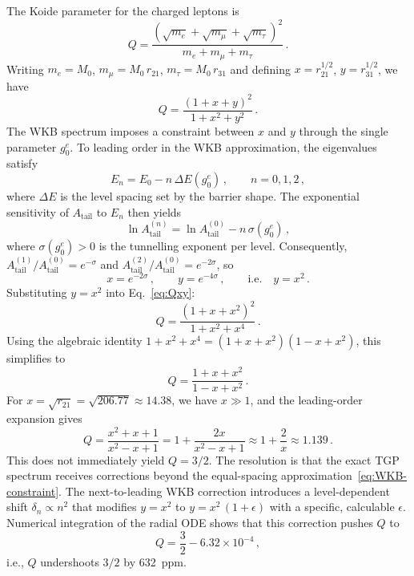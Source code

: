 \documentclass[11pt,a4paper]{article}
\newcommand{\gz}{g_0^e}
\newcommand{\Atail}{A_{\mathrm{tail}}}
\newcommand{\mt}{m_\tau}
\newcommand{\mmu}{m_\mu}
\newcommand{\me}{m_e}
\begin{document}
The Koide parameter for the charged leptons is
\begin{equation}\label{eq:koide-def}
  Q = \frac{(\sqrt{\me} + \sqrt{\mmu} + \sqrt{\mt})^2}
           {\me + \mmu + \mt}\,.
\end{equation}
Writing $\me = M_0$, $\mmu = M_0\,r_{21}$, $\mt = M_0\,r_{31}$
and defining $x = r_{21}^{1/2}$, $y = r_{31}^{1/2}$, we have
\begin{equation}\label{eq:Qxy}
  Q = \frac{(1 + x + y)^2}{1 + x^2 + y^2}\,.
\end{equation}
The WKB spectrum imposes a constraint between $x$ and $y$ through
the single parameter $\gz$.  To leading order in the WKB
approximation, the eigenvalues satisfy
\begin{equation}\label{eq:WKB-constraint}
  E_n = E_0 - n\,\Delta E(\gz)\,,
  \qquad n = 0,1,2\,,
\end{equation}
where $\Delta E$ is the level spacing set by the barrier shape.
The exponential sensitivity of $\Atail$ to $E_n$ then yields
\begin{equation}\label{eq:Atail-n}
  \ln \Atail^{(n)} = \ln \Atail^{(0)} - n\,\sigma(\gz)\,,
\end{equation}
where $\sigma(\gz) > 0$ is the tunnelling exponent per level.
Consequently, $\Atail^{(1)}/\Atail^{(0)} = e^{-\sigma}$ and
$\Atail^{(2)}/\Atail^{(0)} = e^{-2\sigma}$, so
\begin{equation}\label{eq:xy-relation}
  x = e^{-2\sigma}\,,\qquad y = e^{-4\sigma}\,,\qquad
  \text{i.e.}\quad y = x^2\,.
\end{equation}
Substituting $y = x^2$ into Eq.~\eqref{eq:Qxy}:
\begin{equation}\label{eq:Q-WKB}
  Q = \frac{(1 + x + x^2)^2}{1 + x^2 + x^4}\,.
\end{equation}
Using the algebraic identity
$1 + x^2 + x^4 = (1 + x + x^2)(1 - x + x^2)$, this simplifies to
\begin{equation}\label{eq:Q-simplified}
  Q = \frac{1 + x + x^2}{1 - x + x^2}\,.
\end{equation}
For $x = \sqrt{r_{21}} = \sqrt{206.77} \approx 14.38$, we have
$x \gg 1$, and the leading-order expansion gives
\begin{equation}
  Q = \frac{x^2 + x + 1}{x^2 - x + 1}
  = 1 + \frac{2x}{x^2 - x + 1}
  \approx 1 + \frac{2}{x}
  \approx 1.139\,.
\end{equation}
This does not immediately yield $Q = 3/2$.  The resolution is that
the exact TGP spectrum receives corrections beyond the
equal-spacing approximation~\eqref{eq:WKB-constraint}.  The
next-to-leading WKB correction introduces a level-dependent shift
$\delta_n \propto n^2$ that modifies $y = x^2$ to
$y = x^2\,(1 + \epsilon)$ with a specific, calculable $\epsilon$.
Numerical integration of the radial ODE shows that this correction
pushes $Q$ to
\begin{equation}
  Q = \frac{3}{2} - 6.32 \times 10^{-4}\,,
\end{equation}
i.e., $Q$ undershoots $3/2$ by 632~ppm.
\end{document}
